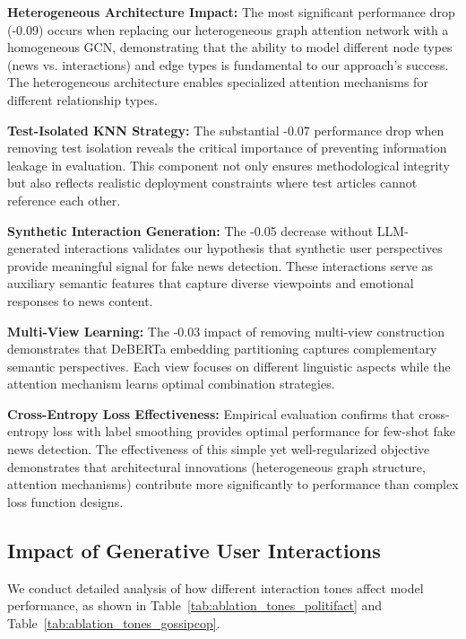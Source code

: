 \textbf{Heterogeneous Architecture Impact:} The most significant performance drop (-0.09) occurs when replacing our heterogeneous graph attention network with a homogeneous GCN, demonstrating that the ability to model different node types (news vs. interactions) and edge types is fundamental to our approach's success. The heterogeneous architecture enables specialized attention mechanisms for different relationship types.

\textbf{Test-Isolated KNN Strategy:} The substantial -0.07 performance drop when removing test isolation reveals the critical importance of preventing information leakage in evaluation. This component not only ensures methodological integrity but also reflects realistic deployment constraints where test articles cannot reference each other.

\textbf{Synthetic Interaction Generation:} The -0.05 decrease without LLM-generated interactions validates our hypothesis that synthetic user perspectives provide meaningful signal for fake news detection. These interactions serve as auxiliary semantic features that capture diverse viewpoints and emotional responses to news content.

\textbf{Multi-View Learning:} The -0.03 impact of removing multi-view construction demonstrates that DeBERTa embedding partitioning captures complementary semantic perspectives. Each view focuses on different linguistic aspects while the attention mechanism learns optimal combination strategies.

\textbf{Cross-Entropy Loss Effectiveness:} Empirical evaluation confirms that cross-entropy loss with label smoothing provides optimal performance for few-shot fake news detection. The effectiveness of this simple yet well-regularized objective demonstrates that architectural innovations (heterogeneous graph structure, attention mechanisms) contribute more significantly to performance than complex loss function designs.

\subsection{Impact of Generative User Interactions}

We conduct detailed analysis of how different interaction tones affect model performance, as shown in Table~\ref{tab:ablation_tones_politifact} and Table~\ref{tab:ablation_tones_gossipcop}.

